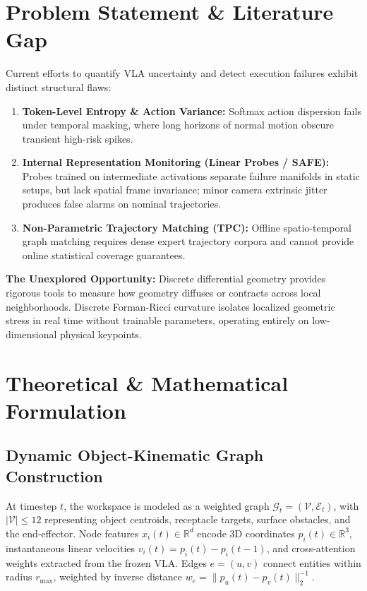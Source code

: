 \documentclass[10pt,a4paper]{article}
\begin{document}
\section{Problem Statement \& Literature Gap}

Current efforts to quantify VLA uncertainty and detect execution failures exhibit distinct structural flaws:
\begin{enumerate}[leftmargin=1.5em, itemsep=0.2em]
    \item \textbf{Token-Level Entropy \& Action Variance:} Softmax action dispersion fails under temporal masking, where long horizons of normal motion obscure transient high-risk spikes.
    \item \textbf{Internal Representation Monitoring (Linear Probes / SAFE):} Probes trained on intermediate activations separate failure manifolds in static setups, but lack spatial frame invariance; minor camera extrinsic jitter produces false alarms on nominal trajectories.
    \item \textbf{Non-Parametric Trajectory Matching (TPC):} Offline spatio-temporal graph matching requires dense expert trajectory corpora and cannot provide online statistical coverage guarantees.
\end{enumerate}

\noindent
\textbf{The Unexplored Opportunity:} Discrete differential geometry provides rigorous tools to measure how geometry diffuses or contracts across local neighborhoods. Discrete Forman-Ricci curvature isolates localized geometric stress in real time without trainable parameters, operating entirely on low-dimensional physical keypoints.

\section{Theoretical \& Mathematical Formulation}

\subsection{Dynamic Object-Kinematic Graph Construction}
At timestep $t$, the workspace is modeled as a weighted graph $\mathcal{G}_t = (\mathcal{V}, \mathcal{E}_t)$, with $|\mathcal{V}| \le 12$ representing object centroids, receptacle targets, surface obstacles, and the end-effector. Node features $x_i(t) \in \mathbb{R}^d$ encode 3D coordinates $p_i(t) \in \mathbb{R}^3$, instantaneous linear velocities $v_i(t) = p_i(t) - p_i(t-1)$, and cross-attention weights extracted from the frozen VLA. Edges $e = (u, v)$ connect entities within radius $r_{\max}$, weighted by inverse distance $w_e = \|p_u(t) - p_v(t)\|_2^{-1}$.
\end{document}
